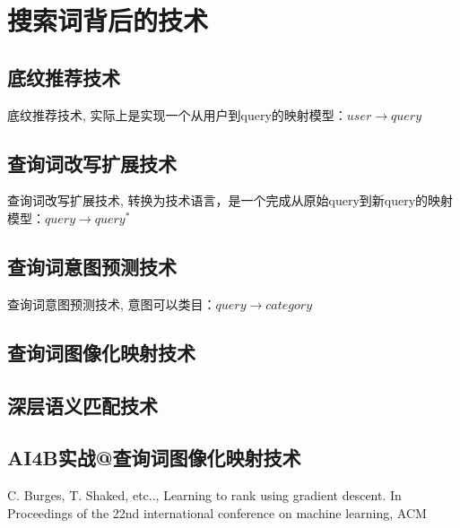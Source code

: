 
\chapter{搜索词背后的技术}
\thispagestyle{empty}

\setlength{\fboxrule}{0pt}\setlength{\fboxsep}{0cm}
\noindent\shadowbox{
\begin{tcolorbox}[arc=0mm,colback=lightblue,colframe=darkblue,title=学习目标与要求]

\end{tcolorbox}}
\setlength{\fboxrule}{1pt}\setlength{\fboxsep}{4pt} 


\section{底纹推荐技术} 
	底纹推荐技术, 实际上是实现一个从用户到query的映射模型：$user \to query$

\section{查询词改写扩展技术}
	查询词改写扩展技术, 转换为技术语言，是一个完成从原始query到新query的映射模型：$query \to query^*$
\section{查询词意图预测技术}
查询词意图预测技术, 意图可以类目：$query \to category$


\section{查询词图像化映射技术} 


\section{深层语义匹配技术} 


\section{AI4B实战@查询词图像化映射技术} 


\begin{thebibliography}{99}
 C. Burges, T. Shaked, etc.., Learning to rank 
using gradient descent. In Proceedings of the 22nd international 
conference on machine learning, ACM
\end{thebibliography}

 
